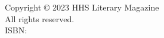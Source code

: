 \vspace*{\fill}
\begin{center}
    Copyright \copyright{} 2023 HHS Literary Magazine\\
    All rights reserved.\\
    ISBN:
\end{center}
